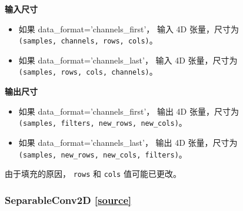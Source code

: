 \textbf{输入尺寸}

\begin{itemize}
\tightlist
\item
  如果 data\_format='channels\_first'， 输入 4D 张量，尺寸为
  \texttt{(samples,\ channels,\ rows,\ cols)}。
\item
  如果 data\_format='channels\_last'， 输入 4D 张量，尺寸为
  \texttt{(samples,\ rows,\ cols,\ channels)}。
\end{itemize}

\textbf{输出尺寸}

\begin{itemize}
\tightlist
\item
  如果 data\_format='channels\_first'， 输出 4D 张量，尺寸为
  \texttt{(samples,\ filters,\ new\_rows,\ new\_cols)}。
\item
  如果 data\_format='channels\_last'， 输出 4D 张量，尺寸为
  \texttt{(samples,\ new\_rows,\ new\_cols,\ filters)}。
\end{itemize}

由于填充的原因， \texttt{rows} 和 \texttt{cols} 值可能已更改。



\subsubsection{SeparableConv2D {\href{https://github.com/keras-team/keras/blob/master/keras/layers/convolutional.py\#L1384}{{[}source{]}}}}

